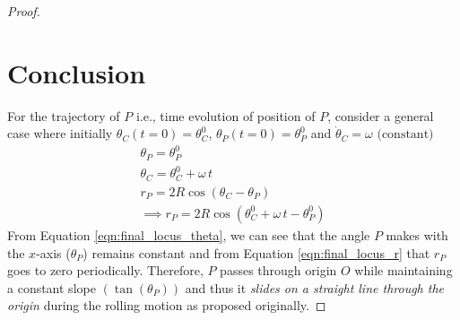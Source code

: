 \documentclass[12pt]{article}
\begin{document}
\begin{proof}
    \section{Conclusion}
    For the trajectory of $P$ i.e., time evolution of position of $P$, consider a general case where initially $\theta_C(t=0) = \theta^0_C$, $\theta_P(t=0) = \theta^0_P$ and $\dot{\theta}_C = \omega \text{ (constant)}$
    \begin{gather}
        \boxed{\theta_P = \theta^0_P} \label{eqn:final_locus_theta} \\
        \theta_C = \theta^0_C + \omega \, t \nonumber \\
        r_P = 2 R \cos \left( \theta_C-\theta_P \right) \nonumber \\
        \implies \boxed{r_P = 2 R \cos \left( \theta^0_C + \omega \, t-\theta^0_P \right)} \label{eqn:final_locus_r}
    \end{gather}
    From Equation \ref{eqn:final_locus_theta}, we can see that the angle $P$ makes with the $x$-axis ($\theta_P$) remains constant and from Equation \ref{eqn:final_locus_r} that $r_P$ goes to zero periodically. Therefore, $P$ passes through origin $O$ while maintaining a constant slope $\left(\tan(\theta_P)\right)$ and thus it \emph{slides on a straight line through the origin} during the rolling motion as proposed originally.
\end{proof}

\end{document}
